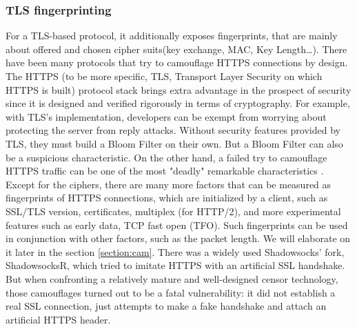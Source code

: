 \documentclass[conference]{IEEEtran}
\begin{document}
\begin{table}[h]
\centering
\caption{Average Entropy for Common Protocols}
\end{table}


\subsubsection{TLS fingerprinting}
For a TLS-based protocol, it additionally exposes fingerprints, that are mainly about offered and chosen cipher suits(key exchange, MAC, Key Length…). There have been many protocols that try to camouflage HTTPS connections by design.
The HTTPS (to be more specific, TLS, Transport Layer Security on which HTTPS is built) protocol stack brings extra advantage in the prospect of security since it is designed and verified rigorously in terms of cryptography. For example, with TLS's implementation, developers can be exempt from worrying about protecting the server from reply attacks. Without security features provided by TLS, they must build a Bloom Filter on their own. But a Bloom Filter can also be a suspicious characteristic.
On the other hand, a failed try to camouflage HTTPS traffic can be one of the most "deadly" remarkable characteristics \cite{TLS_Fingerprinting}. Except for the ciphers, there are many more factors that can be measured as fingerprints of HTTPS connections, which are initialized by a client, such as SSL/TLS version, certificates, multiplex (for HTTP/2), and more experimental features such as early data, TCP fast open (TFO). Such fingerprints can be used in conjunction with other factors, such as the packet length. We will elaborate on it later in the section \ref{section:cam}.
There was a widely used Shadowsocks’ fork, ShadowsocksR, which tried to imitate HTTPS with an artificial SSL handshake. But when confronting a relatively mature and well-designed censor technology, those camouflages turned out to be a fatal vulnerability: it did not establish a real SSL connection, just attempts to make a fake handshake and attach an artificial HTTPS header.
\end{document}
